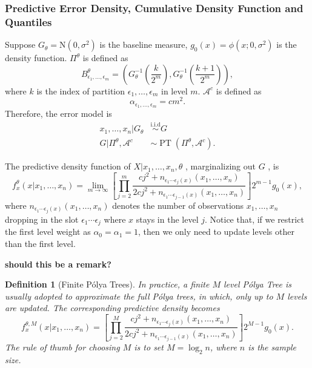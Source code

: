 \documentclass[12pt]{article}
\newtheorem{deff}[thm]{Definition}
\newcommand{\polya}{P\'{o}lya}
\newcommand{\iid}{\stackrel{\text{i.i.d}}{\sim}}
\DeclareMathOperator{\pt}{PT}
\begin{document}
\subsubsection{Predictive Error Density, Cumulative Density Function
  and Quantiles}
Suppose $G_{\theta} = \mathrm{N}(0, \sigma^2)$ is the baseline
measure, $g_0(x) = \phi(x; 0, \sigma^2)$ is the density
function. $\Pi^{\theta}$ is defined as
\begin{displaymath}
B^{\theta}_{\epsilon_1, \ldots, \epsilon_m} = \left( G^{-1}_{\theta}
  \left( \frac{k}{2^m} \right) , G^{-1}_{\theta}\left( \frac{k+1}{2^m} \right) \right),
\end{displaymath}
where $k$ is the index of partition $\epsilon_1, \ldots, \epsilon_m$
in level $m$. $\mathcal{A}^c$ is defined as 
\begin{displaymath}
\alpha_{\epsilon_1, \ldots, \epsilon_m} = cm^2.
\end{displaymath}
Therefore, the error model is 
\begin{align*}
x_1, \ldots, x_n |G_{\theta} & \iid G\\
G|\Pi^{\theta}, \mathcal{A}^{c} & \sim \pt (\Pi^{\theta},
\mathcal{A}^{c}). 
\end{align*}

The predictive density function of $X|x_1, \ldots, x_n, \theta$ ,
marginalizing out $G$ , is  
\begin{equation}
\label{eq:4}
f_x^{\theta} (x|x_1, \ldots, x_n)  = \lim_{m \to \infty} \left[
  \prod_{j=2}^m \frac{cj^2 + n_{\epsilon_1 \cdots \epsilon_j(x) }(x_1 , \ldots, x_n)}{2cj^2
  + n_{\epsilon_1 \cdots \epsilon_{j-1}(x)}(x_1, \ldots, x_n)}
\right]2^{m-1} g_0(x),
\end{equation}
where $n_{\epsilon_1 \cdots \epsilon_j(x) }(x_1 , \ldots, x_n)$
denotes the number of observations $x_1, \ldots, x_n$ dropping in the
slot $\epsilon_1 \cdots \epsilon_j$ where $x$ stays in the level
$j$. Notice that, if  we restrict the first level weight as
$\alpha_0=\alpha_1=1$, then we only need to update levels other than
the first level.

{\bf should this be a remark?}
\begin{deff}[Finite \polya{} Trees]
In practice, a finite $M$ level \polya{} Tree is usually adopted to
approximate the full \polya{} trees, in which, only up to $M$ levels are
updated. The corresponding predictive density becomes 
\begin{equation}
\label{eq:5}
f_x^{\theta, M} (x|x_1, \ldots, x_n)  =  \left[
  \prod_{j=2}^M \frac{cj^2 + n_{\epsilon_1 \cdots \epsilon_j(x) }(x_1 , \ldots, x_n)}{2cj^2
  + n_{\epsilon_1 \cdots \epsilon_{j-1}(x)}(x_1, \ldots, x_n)}
\right]2^{M-1} g_0(x).
\end{equation}
The rule of thumb for choosing $M$ is to set $M=\log_2n$, where $n$ is
the sample size.
\end{deff}
\end{document}
